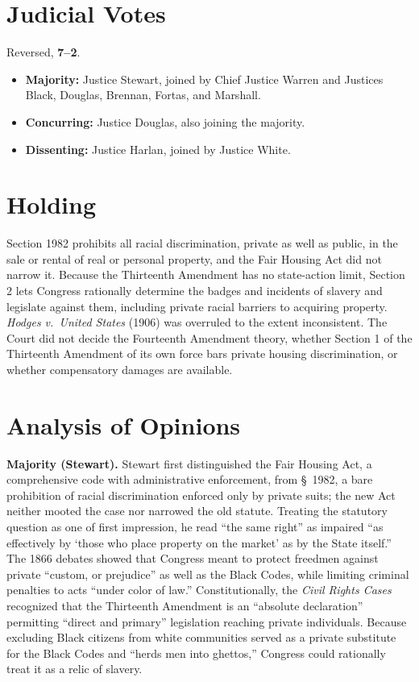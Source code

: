 \documentclass[12pt]{article}
\begin{document}
\section{Judicial Votes}

Reversed, \textbf{7--2}.
\begin{itemize}
\item \textbf{Majority:} Justice Stewart, joined by Chief Justice Warren and Justices Black, Douglas, Brennan, Fortas, and Marshall.
\item \textbf{Concurring:} Justice Douglas, also joining the majority.
\item \textbf{Dissenting:} Justice Harlan, joined by Justice White.
\end{itemize}

\section{Holding}

Section 1982 prohibits all racial discrimination, private as well as public, in the sale or rental of real or personal property, and the Fair Housing Act did not narrow it. Because the Thirteenth Amendment has no state-action limit, Section 2 lets Congress rationally determine the badges and incidents of slavery and legislate against them, including private racial barriers to acquiring property. \textit{Hodges v.\ United States} (1906) was overruled to the extent inconsistent. The Court did not decide the Fourteenth Amendment theory, whether Section 1 of the Thirteenth Amendment of its own force bars private housing discrimination, or whether compensatory damages are available.

\section{Analysis of Opinions}

\textbf{Majority (Stewart).} Stewart first distinguished the Fair Housing Act, a comprehensive code with administrative enforcement, from \S\ 1982, a bare prohibition of racial discrimination enforced only by private suits; the new Act neither mooted the case nor narrowed the old statute. Treating the statutory question as one of first impression, he read ``the same right'' as impaired ``as effectively by `those who place property on the market' as by the State itself.'' The 1866 debates showed that Congress meant to protect freedmen against private ``custom, or prejudice'' as well as the Black Codes, while limiting criminal penalties to acts ``under color of law.'' Constitutionally, the \textit{Civil Rights Cases} recognized that the Thirteenth Amendment is an ``absolute declaration'' permitting ``direct and primary'' legislation reaching private individuals. Because excluding Black citizens from white communities served as a private substitute for the Black Codes and ``herds men into ghettos,'' Congress could rationally treat it as a relic of slavery.
\end{document}
